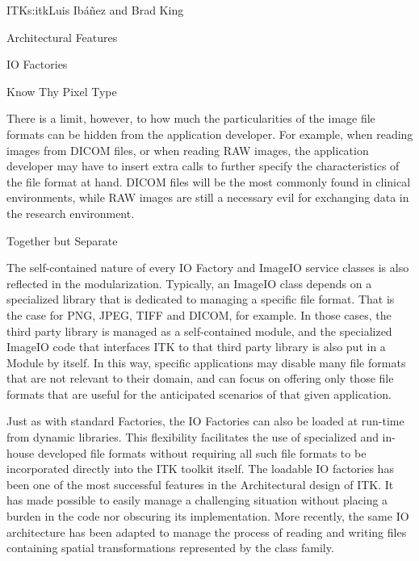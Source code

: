 \begin{aosachapter}{ITK}{s:itk}{Luis Ib\'{a}\~{n}ez and Brad King}
\begin{aosasect1}{Architectural Features}
\begin{aosasect2}{IO Factories}
\begin{aosasect3}{Know Thy Pixel Type}
\begin{aosaitemize}
\item {}
\item {}
\item {}
\item {}
\end{aosaitemize}

There is a limit, however, to how much the particularities of the image file
formats can be hidden from the application developer.  For example, when
reading images from DICOM files, or when reading RAW images, the application
developer may have to insert extra calls to further specify the characteristics
of the file format at hand. DICOM files will be the most commonly found in
clinical environments, while RAW images are still a necessary evil for
exchanging data in the research environment.

\end{aosasect3}

\begin{aosasect3}{Together but Separate}

The self-contained nature of every IO Factory and ImageIO service classes is
also reflected in the modularization. Typically, an ImageIO class depends on a
specialized library that is dedicated to managing a specific file format. That
is the case for PNG, JPEG, TIFF and DICOM, for example. In those cases, the
third party library is managed as a self-contained module, and the specialized
ImageIO code that interfaces ITK to that third party library is also put in a
Module by itself. In this way, specific applications may disable many
file formats that are not relevant to their domain, and can focus on offering
only those file formats that are useful for the anticipated scenarios of that
given application.

Just as with standard Factories, the IO Factories can also be loaded at
run-time from dynamic libraries. This flexibility facilitates the use of
specialized and in-house developed file formats without requiring all such file
formats to be incorporated directly into the ITK toolkit itself. The loadable
IO factories has been one of the most successful features in the Architectural
design of ITK. It has made possible to easily manage a challenging situation
without placing a burden in the code nor obscuring its implementation. More
recently, the same IO architecture has been adapted to manage the process of
reading and writing files containing spatial transformations represented by the
 class family.


\end{aosasect3}
\end{aosasect2}
\end{aosasect1}
\end{aosachapter}
